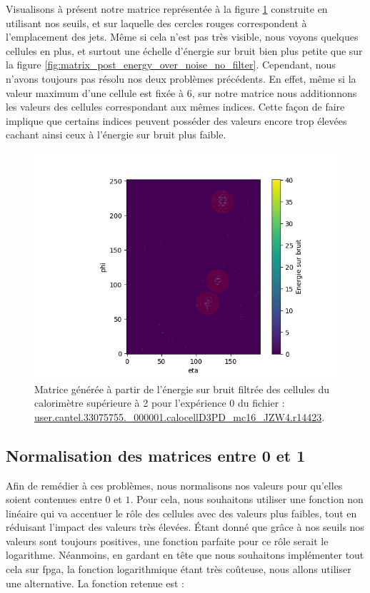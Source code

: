 Visualisons à présent notre matrice représentée à la figure \ref{fig:matrix_post_energy_over_noise} construite en utilisant nos seuils, et sur laquelle des cercles rouges correspondent à l'emplacement des jets. Même si cela n'est pas très visible, nous voyons quelques cellules en plus, et surtout une échelle d'énergie sur bruit bien plus petite que sur la figure \ref{fig:matrix_post_energy_over_noise_no_filter}. Cependant, nous n'avons toujours pas résolu nos deux problèmes précédents. En effet, même si la valeur maximum d'une cellule est fixée à $6$, sur notre matrice nous additionnons les valeurs des cellules correspondant aux mêmes indices. Cette façon de faire implique que certains indices peuvent posséder des valeurs encore trop élevées cachant ainsi ceux à l'énergie sur bruit plus faible.

\begin{figure}[hbt!]
    \centering
    \includegraphics[scale=0.7]{Figures/dataset/matrix_post_energy_over_noise.png}
    \caption{Matrice générée à partir de l'énergie sur bruit filtrée des cellules du calorimètre supérieure à 2 pour l'expérience 0 du fichier : \url{user.cantel.33075755.\_000001.calocellD3PD\_mc16\_JZW4.r14423}.}
    \label{fig:matrix_post_energy_over_noise}
\end{figure}

\break

\subsection{Normalisation des matrices entre 0 et 1}

Afin de remédier à ces problèmes, nous normalisons nos valeurs pour qu'elles soient contenues entre $0$ et $1$. Pour cela, nous souhaitons utiliser une fonction non linéaire qui va accentuer le rôle des cellules avec des valeurs plus faibles, tout en réduisant l'impact des valeurs très élevées. Étant donné que grâce à nos seuils nos valeurs sont toujours positives, une fonction parfaite pour ce rôle serait le logarithme. Néanmoins, en gardant en tête que nous souhaitons implémenter tout cela sur \acrshort{fpga}, la fonction logarithmique étant très coûteuse, nous allons utiliser une alternative. La fonction retenue est :

